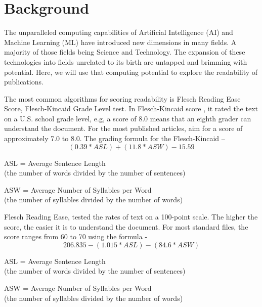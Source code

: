 \documentclass[letterpaper]{article}
\begin{document}
\section*{Background}
The unparalleled computing capabilities of Artificial Intelligence (AI) and Machine Learning (ML) have introduced new dimensions in many fields. A majority of those fields being Science and Technology. The expansion of these technologies into fields unrelated to its birth are untapped and brimming with potential. Here, we will use that computing potential to explore the readability of publications.
\par
The most common algorithms for scoring readability is Flesch Reading Ease Score, Flesch-Kincaid Grade Level test. In Flesch-Kincaid score \parencite[]{Flesch_1948}, it rated the text on a U.S. school grade level, e.g, a score of 8.0 means that an eighth grader can understand the document. For the most published articles, aim for a score of approximately 7.0 to 8.0. The grading formula for the Flesch-Kincaid –
\\
\begin{equation} \label{eq1}
(0.39 * ASL) + (11.8 * ASW) - 15.59
\end{equation}
\begin{center}
ASL = Average Sentence Length\\(the number of words divided by the number of sentences)\\
\end{center}
\begin{center}
ASW = Average Number of Syllables per Word\\(the number of syllables divided by the number of words)\\
\end{center}
\par
Flesch Reading Ease, tested the rates of text on a 100-point scale. The higher the score, the easier it is to understand the document. For most standard files, the score ranges from 60 to 70 using the formula -
\\
\begin{equation} \label{eq2}
206.835 - (1.015 * ASL) - (84.6 * ASW)
\end{equation}
\begin{center}
ASL = Average Sentence Length\\(the number of words divided by the number of sentences)\\
\end{center}
\begin{center}
ASW = Average Number of Syllables per Word\\(the number of syllables divided by the number of words)\\
\end{center}
\end{document}
